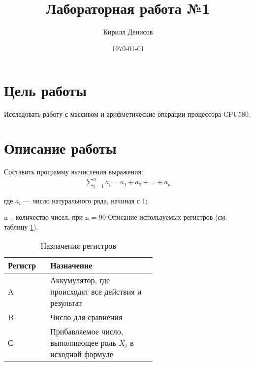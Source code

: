 \documentclass[a4paper,14pt]{extarticle}
\author{Кирилл Денисов}
\title{Лабораторная работа №1}
\date{\today}
\newcommand{\pathToCommonFolder}{/home/denilai/Documents/repos/latex/Common}
\begin{document}
%	
	\setcounter{page}{2}
	
\section*{Цель работы}
Исследовать работу с массивом и арифметические операции процессора
CPU580.
\section*{Описание работы}
\begin{problem*}
	Составить программу вычисления выражения:
	\begin{align}
		\sum_{i=1}^{n}a_i=a_1+a_2+\dots+a_n
	\end{align}

где $a_i$ --- число натурального ряда, начиная с 1;

n – количество чисел, при n = 90
\nonum
Описание используемых регистров (см. таблицу \ref{tab:registers}).

\begin{table}[h!]
	\centering
	\caption{Назначения регистров}
	\begin{tabular}{|m{0.1\linewidth}|p{0.5\linewidth}|}
		\hline
		Регистр & Назначение \\ \hline
		A &  Аккумулятор, где происходят все действия и результат\\ \hline
		B & Число для сравнения\\ \hline
		С & Прибавляемое число,
		выполняющее роль $X_i$ в
		исходной формуле\\\hline
	\end{tabular}
\label{tab:registers}
\end{table}



\end{problem*}
\end{document}
